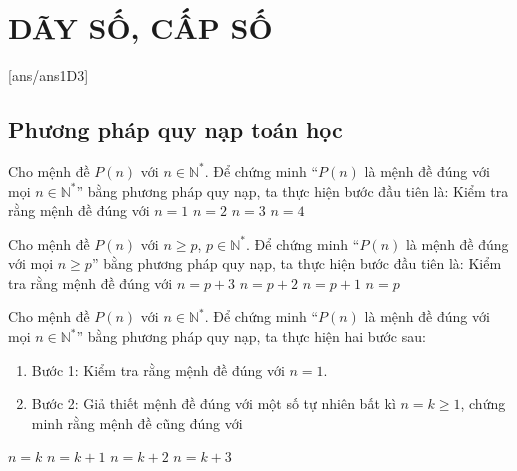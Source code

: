 \section{DÃY SỐ, CẤP SỐ}
[ans/ans1D3]
\subsection{ Phương pháp quy nạp toán học}
\begin{ex}%
	Cho mệnh đề $P(n)$ với $n\in\mathbb{N}^*$. Để chứng minh ``$P(n)$ là mệnh đề đúng với mọi $n\in\mathbb{N}^*$'' bằng phương pháp quy nạp, ta thực hiện bước đầu tiên là: Kiểm tra rằng mệnh đề đúng với
	\choice
	{\True $n=1$}
	{$n=2$}
	{$n=3$}
	{$n=4$}
\end{ex}

\begin{ex}%
	Cho mệnh đề $P(n)$ với $n\geq p$, $p\in\mathbb{N}^*$. Để chứng minh ``$P(n)$ là mệnh đề đúng với mọi $n\geq p$'' bằng phương pháp quy nạp, ta thực hiện bước đầu tiên là: Kiểm tra rằng mệnh đề đúng với
	\choice
	{$n=p+3$}
	{$n=p+2$}
	{$n=p+1$}
	{\True $n=p$}
\end{ex}

\begin{ex}%
	Cho mệnh đề $P(n)$ với $n\in\mathbb{N}^*$. Để chứng minh ``$P(n)$ là mệnh đề đúng với mọi $n\in\mathbb{N}^*$'' bằng phương pháp quy nạp, ta thực hiện hai bước sau:
	\begin{enumerate}[$\bullet$]
		\item Bước 1: Kiểm tra rằng mệnh đề đúng với $n=1$.
		\item Bước 2: Giả thiết mệnh đề đúng với một số tự nhiên bất kì $n=k\geq 1$, chứng minh rằng mệnh đề cũng đúng với
	\end{enumerate}
	\choice
	{$n=k$}
	{\True $n=k+1$}
	{$n=k+2$}
	{$n=k+3$}
\end{ex}


